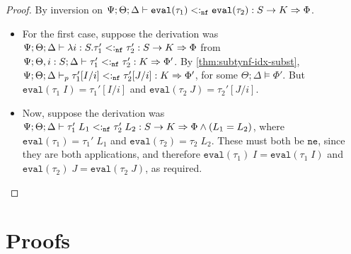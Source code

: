 \evalapplemma*
\begin{proof}
By inversion on $\Psi ; \Theta ; \Delta \vdash \texttt{eval}(\tau_1) <:_{\texttt{nf}} \texttt{eval}(\tau_2) : S \to K \Rightarrow \Phi$.
\begin{itemize}
  \item For the first case, suppose the derivation was $\Psi ; \Theta ; \Delta \vdash \lambda i : S. \tau_1' <:_{\texttt{nf}} \tau_2' : S \to K \Rightarrow \Phi$
  from $\Psi ; \Theta, i : S ; \Delta \vdash \tau_1' <:_{\texttt{nf}} \tau_2' : K \Rightarrow \Phi'$. By \autoref{thm:subtynf-idx-subst},
  $\Psi ; \Theta ; \Delta \vdash_p \tau_1'[I/i] <:_{\texttt{nf}} \tau_2'[J/i] : K \Rightarrow \Phi'$, for some $\Theta ; \Delta \vDash \Phi'$. But $\texttt{eval}(\tau_1 \; I) = \tau_1'[I/i]$ and $\texttt{eval}(\tau_2 \; J) = \tau_2'[J/i]$.
  \item Now, suppose the derivation was $\Psi ; \Theta ; \Delta \vdash \tau_1' \; L_1 <:_{\texttt{nf}} \tau_2' \; L_2 : S \to K \Rightarrow \Phi \wedge (L_1 = L_2)$, where $\texttt{eval}(\tau_1) = \tau_1' \; L_1$ and $\texttt{eval}(\tau_2) = \tau_2 \; L_2$. These must both be $\texttt{ne}$, since they are both applications, and therefore
  $\texttt{eval}(\tau_1) \; I = \texttt{eval}(\tau_1 \; I)$ and $\texttt{eval}(\tau_2) \; J = \texttt{eval}(\tau_2 \; J)$, as required.
\end{itemize}
\end{proof}

\subtycompl*

\admitsweaken*

\tycheckcompl*

\section{Proofs}


































